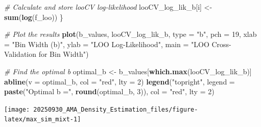 \documentclass[
]{article}
\newenvironment{Shaded}{\begin{snugshade}}{\end{snugshade}}
\newcommand{\AttributeTok}[1]{\textcolor[rgb]{0.13,0.29,0.53}{#1}}
\newcommand{\CommentTok}[1]{\textcolor[rgb]{0.56,0.35,0.01}{\textit{#1}}}
\newcommand{\ConstantTok}[1]{\textcolor[rgb]{0.56,0.35,0.01}{#1}}
\newcommand{\DecValTok}[1]{\textcolor[rgb]{0.00,0.00,0.81}{#1}}
\newcommand{\FunctionTok}[1]{\textcolor[rgb]{0.13,0.29,0.53}{\textbf{#1}}}
\newcommand{\NormalTok}[1]{#1}
\newcommand{\OtherTok}[1]{\textcolor[rgb]{0.56,0.35,0.01}{#1}}
\newcommand{\SpecialCharTok}[1]{\textcolor[rgb]{0.81,0.36,0.00}{\textbf{#1}}}
\newcommand{\StringTok}[1]{\textcolor[rgb]{0.31,0.60,0.02}{#1}}
\begin{document}
\begin{Shaded}
\begin{Highlighting}[]
  \CommentTok{\# Calculate and store looCV log{-}likelihood}
\NormalTok{  looCV\_log\_lik\_b[i] }\OtherTok{\textless{}{-}} \FunctionTok{sum}\NormalTok{(}\FunctionTok{log}\NormalTok{(f\_loo))}
\NormalTok{\}}

\CommentTok{\# Plot the results}
\FunctionTok{plot}\NormalTok{(b\_values, looCV\_log\_lik\_b, }\AttributeTok{type =} \StringTok{"b"}\NormalTok{, }\AttributeTok{pch =} \DecValTok{19}\NormalTok{,}
     \AttributeTok{xlab =} \StringTok{"Bin Width (b)"}\NormalTok{, }\AttributeTok{ylab =} \StringTok{"LOO Log{-}Likelihood"}\NormalTok{,}
     \AttributeTok{main =} \StringTok{"LOO Cross{-}Validation for Bin Width"}\NormalTok{)}

\CommentTok{\# Find the optimal b}
\NormalTok{optimal\_b }\OtherTok{\textless{}{-}}\NormalTok{ b\_values[}\FunctionTok{which.max}\NormalTok{(looCV\_log\_lik\_b)]}
\FunctionTok{abline}\NormalTok{(}\AttributeTok{v =}\NormalTok{ optimal\_b, }\AttributeTok{col =} \StringTok{"red"}\NormalTok{, }\AttributeTok{lty =} \DecValTok{2}\NormalTok{)}
\FunctionTok{legend}\NormalTok{(}\StringTok{"topright"}\NormalTok{, }\AttributeTok{legend =} \FunctionTok{paste}\NormalTok{(}\StringTok{"Optimal b ="}\NormalTok{, }\FunctionTok{round}\NormalTok{(optimal\_b, }\DecValTok{3}\NormalTok{)), }\AttributeTok{col =} \StringTok{"red"}\NormalTok{, }\AttributeTok{lty =} \DecValTok{2}\NormalTok{)}
\end{Highlighting}
\end{Shaded}

\begin{center}\texttt{[image: 20250930\_AMA\_Density\_Estimation\_files/figure-latex/max\_sim\_mixt-1]} \end{center}

\begin{Shaded}
\end{Shaded}
\end{document}
